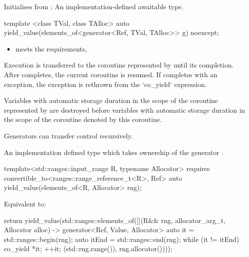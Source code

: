 \documentclass{wg21}
\begin{document}
\begin{addedblock}
\begin{itemdescr}
\effects
Initialises  from ;
\returns An implementation-defined awaitable type.

\end{itemdescr}


\begin{itemdecl}
template <class TVal, class TAlloc>
auto yield_value(elements_of<generator<Ref, TVal, TAlloc>> g) noexcept;
\end{itemdecl}

\begin{itemdescr}

\mandates
\begin{itemize}
\item {} meets the  requirements,
\end{itemize}

\effects
Execution is transferred to the coroutine represented by  until its completion.
After  completes, the current coroutine is resumed.
If  completes with an exception, the exception is rethrown from the `co_yield` expression.

Variables with automatic storage duration in the scope of the coroutine represented by  are destroyed
before variables with automatic storage duration in the scope of the coroutine denoted by this coroutine.

\begin{note}
Generators can transfer control recursively.
\end{note}

\returns An implementation defined  type which takes ownership of the generator .

\end{itemdescr}


\begin{itemdecl}
template<std::ranges::input_range R, typename Allocator>
requires convertible_to<ranges::range_reference_t<R>, Ref>
auto yield_value(elements_of<R, Allocator> rng);
\end{itemdecl}

\begin{itemdescr}
\effects
Equivalent to:
\begin{codeblock}
{
    return yield_value(std::ranges::elements_of([](R&& rng, allocator_arg_t, Allocator alloc) 
    -> generator<Ref, Value, Allocator> {
        auto it = std::ranges::begin(rng);
        auto itEnd = std::ranges::end(rng);
        while (it != itEnd) {
            co_yield *it;
            ++it;
        }
    }(std::rng.range()), rng.allocator())));
}
\end{codeblock}


\end{itemdescr}
\end{addedblock}
\end{document}
